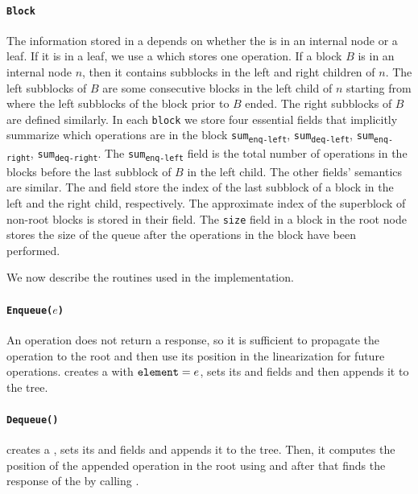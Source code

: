 \paragraph{\tt{Block}}
 The information stored in a  depends on whether  the
  is in an internal node or a leaf. If it is in a leaf, we
 use a  which stores one operation. If a block $B$ is in
 an internal node $n$, then it contains subblocks in the left and
 right children of $n$. The left subblocks of $B$ are some consecutive
 blocks in the left child of $n$ starting from where the left
 subblocks of the block prior to $B$ ended. The right subblocks of $B$
 are defined similarly. In each \texttt{block} we store four essential
 fields that implicitly summarize which operations are in the block
 \texttt{sum\textsubscript{enq-left}},
 \texttt{sum\textsubscript{deq-left}},
 \texttt{sum\textsubscript{enq-right}},
 \texttt{sum\textsubscript{deq-right}}. The
 \texttt{sum\textsubscript{enq-left}} field is the total number of
  operations in the blocks before the last subblock of $B$
 in the left child. The other fields' semantics are similar. The
  and  field store the index of
 the last subblock of a block in the left and the right child,
 respectively. The approximate index of the superblock of non-root
 blocks is stored in their  field. The \texttt{size} field
 in a block in the root node stores the size of the queue after the
 operations in the block have been performed.  

We now describe the routines used in the implementation.

\paragraph{\tt{Enqueue($e$)}}
An  operation does not return a response, so it is
sufficient to propagate the  operation to the root and
then use its position in the linearization for future 
operations.  creates a  with
${\normalfont{\texttt{element}}}=e$, sets its  and 
fields and then appends it to the tree. 

\paragraph{\tt{Dequeue()}}
 creates a , sets its  and
 fields and appends it to the tree. Then, it computes
the position of the appended  operation in the root using
 and after that finds the response of the
 by calling . 


